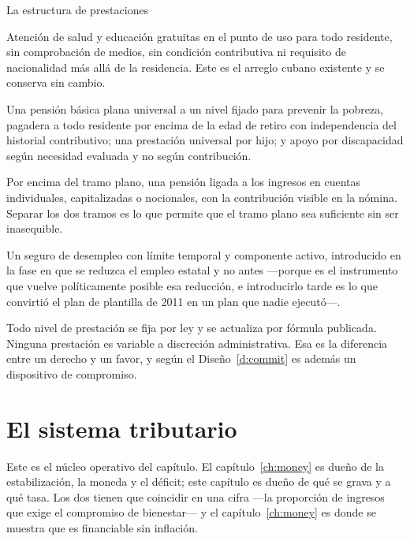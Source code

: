 \begin{design}{La estructura de prestaciones}
\label{d:benefit}
\begin{rules}
 Atención de salud y educación gratuitas en el punto de
uso para todo residente, sin comprobación de medios, sin condición contributiva ni
requisito de nacionalidad más allá de la residencia. Este es el arreglo cubano
existente y se conserva sin cambio.

 Una pensión básica plana universal a un nivel fijado
para prevenir la pobreza, pagadera a todo residente por encima de la edad de retiro
con independencia del historial contributivo; una prestación universal por hijo; y
apoyo por discapacidad según necesidad evaluada y no según contribución.

 Por encima del tramo plano, una pensión
ligada a los ingresos en cuentas individuales, capitalizadas o nocionales, con la
contribución visible en la nómina. Separar los dos tramos es lo que permite que el
tramo plano sea suficiente sin ser inasequible.

 Un seguro de desempleo con límite temporal y componente activo,
introducido en la fase en que se reduzca el empleo estatal y no antes ---porque es el
instrumento que vuelve políticamente posible esa reducción, e introducirlo tarde es lo
que convirtió el plan de plantilla de 2011 en un plan que nadie ejecutó---.

 Todo nivel de prestación se fija por ley y se
actualiza por fórmula publicada. Ninguna prestación es variable a discreción
administrativa. Esa es la diferencia entre un derecho y un favor, y según el
Diseño~\ref{d:commit} es además un dispositivo de compromiso.
\end{rules}
\end{design}

\section{El sistema tributario}

Este es el núcleo operativo del capítulo. El capítulo~\ref{ch:money} es dueño de la
estabilización, la moneda y el déficit; este capítulo es dueño de qué se grava y a
qué tasa. Los dos tienen que coincidir en una cifra ---la proporción de ingresos que
exige el compromiso de bienestar--- y el capítulo~\ref{ch:money} es donde se muestra
que es financiable sin inflación.

